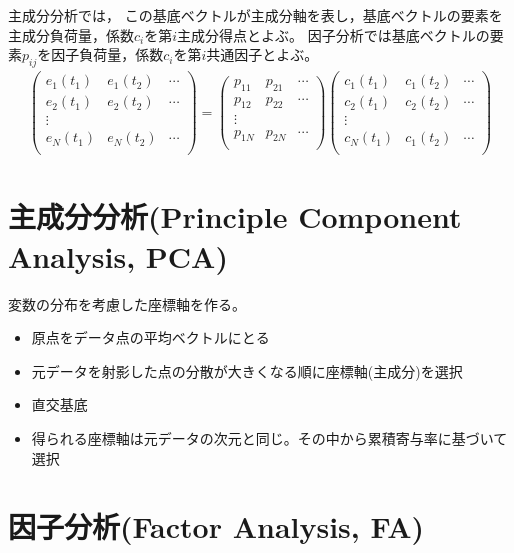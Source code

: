 \documentclass[a4paper,11pt]{jsarticle}
\begin{document}
主成分分析では，
この基底ベクトルが主成分軸を表し，基底ベクトルの要素を主成分負荷量，係数$c_i$を第$i$主成分得点とよぶ。
因子分析では基底ベクトルの要素$p_{ij}$を因子負荷量，係数$c_i$を第$i$共通因子とよぶ。
\begin{align}
  \begin{pmatrix}
    e_1(t_1) & e_1(t_2) &\cdots\\
    e_2(t_1) & e_2(t_2) & \cdots\\
    \vdots&&\\
    e_N(t_1)& e_N(t_2) & \cdots\\
  \end{pmatrix}
  =
  \begin{pmatrix}
  p_{11} &p_{21}& \cdots\\
  p_{12} &p_{22}& \cdots\\
  \vdots &&\\
  p_{1N} &p_{2N}& \cdots\\
  \end{pmatrix}
  \begin{pmatrix}
    c_1(t_1) & c_1(t_2) & \cdots\\
    c_2(t_1) & c_2(t_2) & \cdots\\
    \vdots & & \\
    c_N(t_1) & c_1(t_2) & \cdots\\
    \end{pmatrix}
  \end{align}

  \section{主成分分析(Principle Component Analysis, PCA)}

変数の分布を考慮した座標軸を作る。

\begin{itemize}
\item 原点をデータ点の平均ベクトルにとる
\item 元データを射影した点の分散が大きくなる順に座標軸(主成分)を選択
\item 直交基底
\item 得られる座標軸は元データの次元と同じ。その中から累積寄与率に基づいて選択
\end{itemize}

\section{因子分析(Factor Analysis, FA)}
\end{document}
